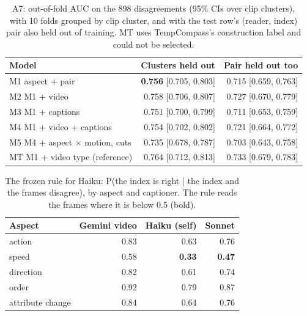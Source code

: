 \documentclass[11pt]{article}
\begin{document}
\begin{table}[t]
\centering
\scriptsize
\setlength{\tabcolsep}{3pt}
\begin{tabular}{@{}lrr@{}}
\toprule
Model & Clusters held out & Pair held out too \\
\midrule
M1 aspect + pair & \textbf{0.756} [0.705, 0.803] & 0.715 [0.659, 0.763] \\
M2 M1 + video & 0.758 [0.706, 0.807] & 0.727 [0.670, 0.779] \\
M3 M1 + captions & 0.751 [0.700, 0.799] & 0.711 [0.653, 0.759] \\
M4 M1 + video + captions & 0.754 [0.702, 0.802] & 0.721 [0.664, 0.772] \\
M5 M4 + aspect × motion, cuts & 0.735 [0.678, 0.787] & 0.703 [0.643, 0.758] \\
MT M1 + video type (reference) & 0.764 [0.712, 0.813] & 0.733 [0.679, 0.783] \\
\bottomrule
\end{tabular}
\caption{A7: out-of-fold AUC on the 898 disagreements (95\% CIs over clip clusters), with 10 folds grouped by clip cluster, and with the test row's (reader, index) pair also held out of training. MT uses TempCompass's construction label and could not be selected.}
\label{tab:a7}
\end{table}

\begin{table}[t]
\centering
\scriptsize
\setlength{\tabcolsep}{4pt}
\begin{tabular}{@{}lrrr@{}}
\toprule
Aspect & Gemini video & Haiku (self) & Sonnet \\
\midrule
action & 0.83 & 0.63 & 0.76 \\
speed & 0.58 & \textbf{0.33} & \textbf{0.47} \\
direction & 0.82 & 0.61 & 0.74 \\
order & 0.92 & 0.79 & 0.87 \\
attribute change & 0.84 & 0.64 & 0.76 \\
\bottomrule
\end{tabular}
\caption{The frozen rule for Haiku: P(the index is right | the index and the frames disagree), by aspect and captioner. The rule reads the frames where it is below 0.5 (bold).}
\label{tab:a8rule}
\end{table}
\end{document}
